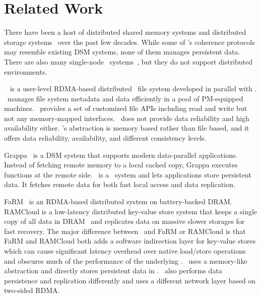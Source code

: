 \section{Related Work}
\label{sec:related}

There have been a host of distributed shared memory systems and
distributed storage
systems~\cite{AdyaEtAl-Farsite,calder11-azure,DeCandia+07-Dynamo,Ghemawat03-GoogleFS,KubiEtAl00-Ocean,Petersen97-Bayou,Terry13-Pileus,Chun06-NSDI,Gibbons91-SPAA,Krieger90-HICSS,Zhang15-SOSP,Zhou92-IEEE,Stumm90-IEEE,Stumm90-IPDPS,HLRC,Shasta}
over the past few decades.
While some of \hotpot's coherence protocols may resemble existing DSM systems, none of them manages persistent data.
There are also many single-node \nvm\ systems~\cite{MemoryPersistency,pmxact-asplos16,Delegated-persist,sosp09:bpfs,Dragojevic14-NSDI,Dulloor14-EuroSys,Xiaojian11-SC,HiNFS-Eurosys16,Kamino-EuroSys17,Coburn11-ASPLOS,Volos11-ASPLOS},
but they do not support distributed environments.

\Octopus~\cite{Octopus} is a user-level RDMA-based distributed \nvm\ file system developed in parallel with \hotpot.
\Octopus\ manages file system metadata and data efficiently in a pool of PM-equipped machines. 
\Octopus\ provides a set of customized file APIs including read and write
but not any memory-mapped interfaces.
\Octopus\ does not provide data reliability and high availability either.
\hotpot's abstraction is memory based rather than file based,
and it offers data reliability, availability, and different consistency levels.

Grappa~\cite{Nelson15-ATC} is a DSM system that supports modern data-parallel applications.
Instead of fetching remote memory to a local cached copy, Grappa executes functions at the remote side.
\hotpot\ is a \dsnvm\ system and lets applications store persistent data.
It fetches remote data for both fast local access and data replication.

FaRM~\cite{Kalia14-SIGCOMM,Dragojevic14-NSDI} is an RDMA-based
distributed system on battery-backed DRAM.
RAMCloud is a low-latency distributed key-value store system that keeps a single copy of all data in DRAM~\cite{Ongaro11-RamCloud}
and replicates data on massive slower storages for fast recovery.
The major difference between \hotpot\ and FaRM or RAMCloud is that
FaRM and RAMCloud both adds a software indirection layer for key-value stores
which can cause significant latency overhead over native load/store operations
and obscures much of the performance of the underlying \nvm.
\hotpot\ uses a memory-like abstraction and directly stores persistent data in \nvm.
\hotpot\ also performs data persistence and replication differently
and uses a different network layer based on two-sided RDMA.

